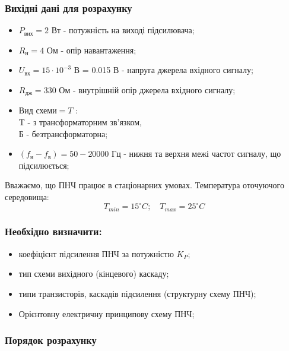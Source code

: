 \documentclass[main.tex]{subfiles}
\begin{document}
\subsubsection{Вихідні дані для розрахунку}

\begin{itemize}
    \item $P_\text{вих} = 2$ Вт - потужність на виході підсилювача;
    \item $R_\text{н} = 4$ Ом - опір навантаження;
    \item $U_\text{вх} = 15 \cdot 10^{-3}$ В = 0.015 В - напруга джерела вхідного сигналу;
    \item $R_{\text{дж}} = 330$ Ом - внутрішній опір джерела вхідного сигналу;
    \item $\text{Вид схеми} = T$ : \\T - з трансформаторним зв'язком, \\Б - безтрансформаторна;
    \item $(f_{\text{н}} - f_{\text{в}}) = 50 - 20000$ Гц - нижня та верхня межі частот сигналу, що підсилюється;
\end{itemize}

Вважаємо, що ПНЧ працює в стаціонарних умовах. Температура оточуючого середовища: 
\[
T_{min} = 15^\circ C; \quad T_{max} = 25^\circ C
\]
\subsubsection{Необхідно визначити:}

\begin{itemize}
    \item коефіцієнт підсилення ПНЧ за потужністю $K_P$;
    \item тип схеми вихідного (кінцевого) каскаду;
    \item типи транзисторів, каскадів підсилення (структурну схему ПНЧ);
    \item Орієнтовну електричну принципову схему ПНЧ;
\end{itemize}


\subsubsection{Порядок розрахунку}
\end{document}
